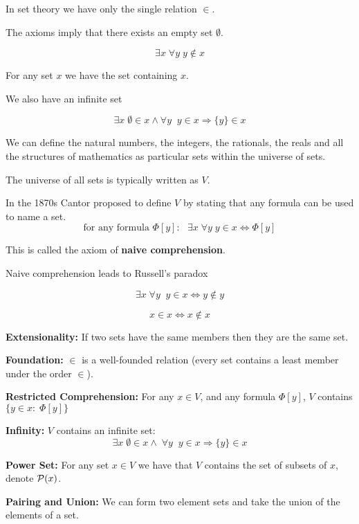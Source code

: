 {

In set theory we have only the single relation $\in$.

\vfill
The axioms imply that there exists an empty set $\emptyset$.

$$\exists x\; \forall y \;y \not\in x$$

\vfill
For any set $x$ we have the set containing $x$.

\vfill
We also have an infinite set

$$\exists x \; \emptyset\in x \wedge \forall y\; \;y \in x \Rightarrow \{y\} \in x$$

\vfill
We can define the natural numbers, the integers, the rationals, the reals and all the structures of mathematics
as particular sets within the universe of sets.


The universe of all sets is typically written as $V$.

\vfill
In the 1870s Cantor proposed to define $V$ by stating that any formula can be used to name a set.
$$\mbox{for any formula $\Phi[y]$:}\;\;\;\exists x\;\forall y \;y \in x \Leftrightarrow \Phi[y]$$

\vfill
This is called the axiom of {\bf naive comprehension}.

\vfill
Naive comprehension leads to Russell's paradox

$$\exists x\;\forall y\;\;y \in x \Leftrightarrow y \not\in y$$

$$x \in x \Leftrightarrow x \not\in x$$


{\bf Extensionality:} If two sets have the same members then they are the same set.

\vfill
{\bf Foundation:} $\in$ is a well-founded relation (every set contains a least member under the order $\in$).

\vfill
{\bf Restricted Comprehension:} For any $x \in V$, and any formula $\Phi[y]$, $V$ contains $\{y\in x:\;\Phi[y]\}$

\vfill
{\bf Infinity:} $V$ contains an infinite set:
$$\exists x \; \emptyset\in x \wedge  \; \forall y\; \;y \in x \Rightarrow \{y\} \in x$$


{\bf Power Set:} For any set $x \in V$ we have that $V$ contains the set of subsets of $x$, denote ${\cal P}(x)$.

\vfill
{\bf Pairing and Union:} We can form two element sets and take the union of the elements of a set.

}
